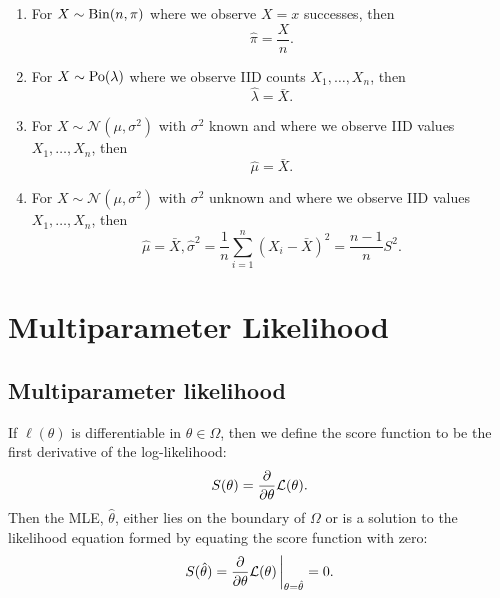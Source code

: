 \documentclass[10pt, a4paper]{article}
\begin{document}
\begin{proposition}
    \begin{enumerate}[label = (\roman*)]
        \item For $X \sim \operatorname{Bin}(n, \pi)$ where we observe $X = x$ successes,
        then
        \[
        \hat{\pi} = \frac{X}{n}.
        \]

        \item For $X \sim \operatorname{Po}(\lambda)$ where we observe IID counts $X_1, \dotsc, X_n$,
        then
        \[
        \hat{\lambda} = \bar{X}.
        \]

        \item For $X \sim \mathcal{N}(\mu, \sigma ^ 2)$ with $\sigma ^ 2$ known and where we observe IID values $X_1, \dotsc, X_n$,
        then
        \[
        \hat{\mu} = \bar{X}.
        \]

        \item For $X \sim \mathcal{N}(\mu, \sigma ^ 2)$ with $\sigma ^ 2$ unknown and where we observe IID values $X_1, \dotsc, X_n$,
        then
        \[
        \hat{\mu} = \bar{X}, \hat{\sigma} ^ 2 = \frac{1}{n}\sum_{i = 1}^{n}(X_i - \bar{X}) ^ 2 = \frac{n - 1}{n}S ^ 2.
        \]
    \end{enumerate}
\end{proposition}

\newpage

\section{Multiparameter Likelihood}

\subsection{Multiparameter likelihood}

\begin{definition}
    If $\ell(\theta)$ is differentiable in $\theta \in \Omega$,
    then we define the score function to be the first derivative of the log-likelihood:
    \[
    S(\theta) = \frac{\partial }{\partial \theta}\mathcal{L}(\theta).
    \]
    Then the MLE,
    $\hat{\theta}$,
    either lies on the boundary of $\Omega$ or is a solution to the likelihood equation formed by equating the score function with zero:
    \[
    S(\hat{\theta}) = \frac{\partial }{\partial \theta}\mathcal{L}(\theta)\,\biggr|_{\theta = \hat{\theta}} = 0.
    \]
\end{definition}
\end{document}
